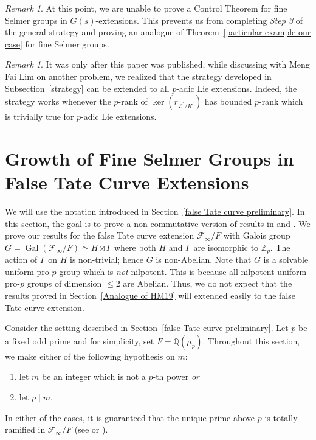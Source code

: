 \documentclass{amsart}
\DeclareMathOperator{\Gal}{Gal}
\newcommand{\QQ}{\mathbb Q}
\newcommand{\F}{\mathcal F}
\newcommand{\ZZ}{\mathbb Z}
\newcommand{\Linf}{\mathcal{L}}
\theoremstyle{definition}
\theoremstyle{remark}
\newtheorem{rem}[Th]{Remark}
\begin{document}
\begin{rem}
At this point, we are unable to prove a Control Theorem for fine Selmer groups in $G(s)$-extensions.
This prevents us from completing \textit{Step 3} of the general strategy and proving an analogue of Theorem~\ref{particular example our case} for fine Selmer groups.
\end{rem}

\begin{rem}
It was only after this paper was published, while discussing with Meng Fai Lim on another problem, we realized that the strategy developed in Subsection~\ref{strategy} can be extended to all $p$-adic Lie extensions.
Indeed, the strategy works whenever the $p$-rank of $\ker(r_{\Linf^\prime/K^\prime})$ has bounded $p$-rank which is trivially true for $p$-adic Lie extensions.
\end{rem}
\section{Growth of Fine Selmer Groups in False Tate Curve Extensions} \label{Analogue of Lei17}

We will use the notation introduced in Section~\ref{false Tate curve preliminary}.
In this section, the goal is to prove a non-commutative version of results in \cite[Section 5]{LM15} and \cite[Section 3.3]{Kun20}.
We prove our results for the false Tate curve extension $\F_\infty/F$ with Galois group $G=\Gal(\F_\infty/F)\simeq H \rtimes \Gamma$ where both $H$ and $\Gamma$ are isomorphic to $\ZZ_p$.
The action of $\Gamma$ on $H$ is non-trivial; hence $G$ is non-Abelian.
Note that $G$ is a solvable uniform pro-$p$ group which is \textit{not} nilpotent.
This is because all nilpotent uniform pro-$p$ groups of dimension $\leq 2$ are Abelian.
Thus, we do not expect that the results proved in Section~\ref{Analogue of HM19} will extended easily to the false Tate curve extension.

Consider the setting described in Section~\ref{false Tate curve preliminary}.
Let $p$ be a fixed odd prime and for simplicity, set $F= \QQ(\mu_p)$.
Throughout this section, we make either of the following hypothesis on $m$:
\begin{enumerate}
\item let $m$ be an integer which is not a $p$-th power \textit{or}
\item let $p\mid m$.
\end{enumerate} 
In either of the cases, it is guaranteed that the unique prime above $p$ is totally ramified in $\F_\infty/F$ (see \cite[Lemma 3.9(ii)]{HV03} or \cite{Lee13}).
\end{document}
